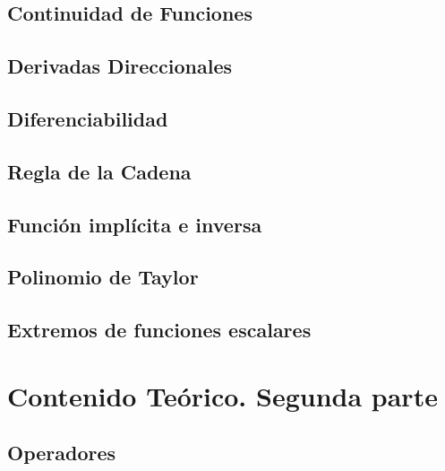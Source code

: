 \documentclass[10pt, a4paper]{report}
\begin{document}
      
          
   \section{Continuidad de Funciones}
    
          
  
          
       \section{Derivadas Direccionales}
        
            
 
\section{Diferenciabilidad}

 
\section{Regla de la Cadena}
  


 \section{Funci\'on impl\'icita e inversa}    
   
      

 \section{Polinomio de Taylor} 
  
   
   
   
        
      \section{Extremos de funciones escalares} 
        

 



    \chapter{Contenido Teórico. Segunda parte}
      \section{Operadores}
       
   
\end{document}
